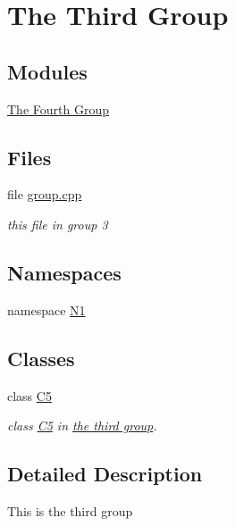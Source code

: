 \hypertarget{group__group3}{\section{The Third Group}
\label{group__group3}
}
\subsection*{Modules}
\begin{DoxyCompactItemize}
\item 
\hyperlink{group__group4}{The Fourth Group}
\end{DoxyCompactItemize}
\subsection*{Files}
\begin{DoxyCompactItemize}
\item 
file \hyperlink{group_8cpp}{group.\-cpp}
\begin{DoxyCompactList}\small\item\em this file in group 3 \end{DoxyCompactList}\end{DoxyCompactItemize}
\subsection*{Namespaces}
\begin{DoxyCompactItemize}
\item 
namespace \hyperlink{namespace_n1}{N1}
\end{DoxyCompactItemize}
\subsection*{Classes}
\begin{DoxyCompactItemize}
\item 
class \hyperlink{class_c5}{C5}
\begin{DoxyCompactList}\small\item\em class \hyperlink{class_c5}{C5} in \hyperlink{group__group3}{the third group}. \end{DoxyCompactList}\end{DoxyCompactItemize}


\subsection{Detailed Description}
This is the third group 